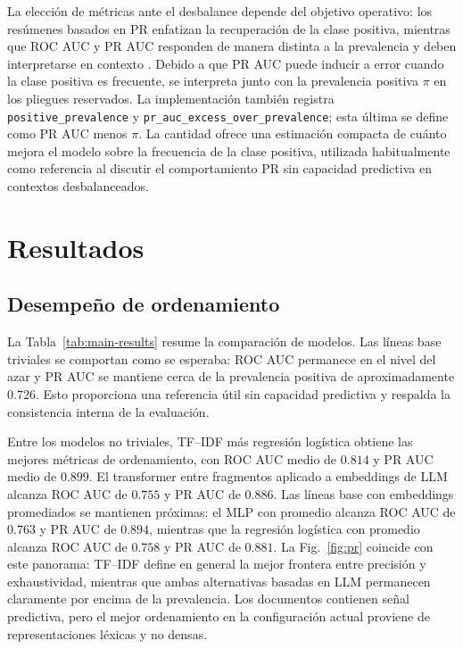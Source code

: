 La elección de métricas ante el desbalance depende del objetivo operativo: los resúmenes basados en PR enfatizan la recuperación de la clase positiva, mientras que ROC AUC y PR AUC responden de manera distinta a la prevalencia y deben interpretarse en contexto \cite{richardson2024roc}. Debido a que PR AUC puede inducir a error cuando la clase positiva es frecuente, se interpreta junto con la prevalencia positiva $\pi$ en los pliegues reservados. La implementación también registra \texttt{positive\_prevalence} y \texttt{pr\_auc\_excess\_over\_prevalence}; esta última se define como PR AUC menos $\pi$. La cantidad ofrece una estimación compacta de cuánto mejora el modelo sobre la frecuencia de la clase positiva, utilizada habitualmente como referencia al discutir el comportamiento PR sin capacidad predictiva en contextos desbalanceados.

\chapter{Resultados}
\section{Desempeño de ordenamiento}
La Tabla~\ref{tab:main-results} resume la comparación de modelos. Las líneas base triviales se comportan como se esperaba: ROC AUC permanece en el nivel del azar y PR AUC se mantiene cerca de la prevalencia positiva de aproximadamente $0.726$. Esto proporciona una referencia útil sin capacidad predictiva y respalda la consistencia interna de la evaluación.

Entre los modelos no triviales, TF--IDF más regresión logística obtiene las mejores métricas de ordenamiento, con ROC AUC medio de $0.814$ y PR AUC medio de $0.899$. El transformer entre fragmentos aplicado a embeddings de LLM alcanza ROC AUC de $0.755$ y PR AUC de $0.886$. Las líneas base con embeddings promediados se mantienen próximas: el MLP con promedio alcanza ROC AUC de $0.763$ y PR AUC de $0.894$, mientras que la regresión logística con promedio alcanza ROC AUC de $0.758$ y PR AUC de $0.881$. La Fig.~\ref{fig:pr} coincide con este panorama: TF--IDF define en general la mejor frontera entre precisión y exhaustividad, mientras que ambas alternativas basadas en LLM permanecen claramente por encima de la prevalencia. Los documentos contienen señal predictiva, pero el mejor ordenamiento en la configuración actual proviene de representaciones léxicas y no densas.

